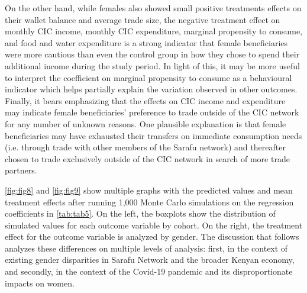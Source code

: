 \documentclass[12pt]{article}
\begin{document}
On the other hand, while females also showed small positive treatments effects on their wallet balance and average trade size, the negative treatment effect on monthly CIC income, monthly CIC expenditure, marginal propensity to consume, and food and water expenditure is a strong indicator that female beneficiaries were more cautious than even the control group in how they chose to spend their additional income during the study period. In light of this, it may be more useful to interpret the coefficient on marginal propensity to consume as a behavioural indicator which helps partially explain the variation observed in other outcomes. Finally, it bears emphasizing that the effects on CIC income and expenditure may indicate female beneficiaries’ preference to trade outside of the CIC network for any number of unknown reasons. One plausible explanation is that female beneficiaries may have exhausted their transfers on immediate consumption needs (i.e. through trade with other members of the Sarafu network) and thereafter chosen to trade exclusively outside of the CIC network in search of more trade partners.

\autoref{fig:fig8} and \autoref{fig:fig9} show multiple graphs with the predicted values and mean treatment effects after running 1,000 Monte Carlo simulations on the regression coefficients in \autoref{tab:tab5}. On the left, the boxplots show the distribution of simulated values for each outcome variable by cohort. On the right, the treatment effect for the outcome variable is analyzed by gender. The discussion that follows analyzes these differences on multiple levels of analysis: first, in the context of existing gender disparities in Sarafu Network and the broader Kenyan economy, and secondly, in the context of the Covid-19 pandemic and its disproportionate impacts on women.
\end{document}

